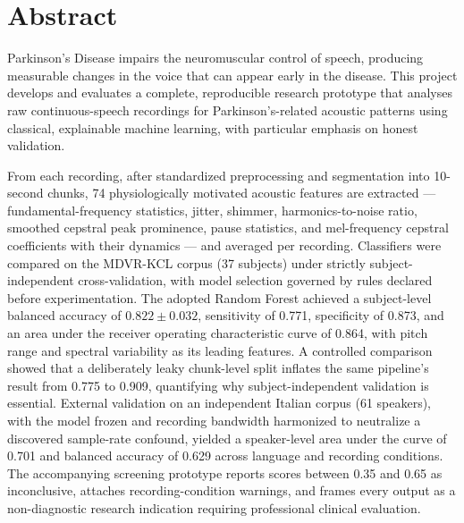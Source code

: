 \chapter*{Abstract}

Parkinson's Disease impairs the neuromuscular control of speech,
producing measurable changes in the voice that can appear early in the
disease. This project develops and evaluates a complete, reproducible
research prototype that analyses raw continuous-speech recordings for
Parkinson's-related acoustic patterns using classical, explainable
machine learning, with particular emphasis on honest validation.

From each recording, after standardized preprocessing and segmentation
into 10-second chunks, 74 physiologically motivated acoustic features
are extracted --- fundamental-frequency statistics, jitter, shimmer,
harmonics-to-noise ratio, smoothed cepstral peak prominence, pause
statistics, and mel-frequency cepstral coefficients with their
dynamics --- and averaged per recording. Classifiers were compared on
the MDVR-KCL corpus (37 subjects) under strictly subject-independent
cross-validation, with model selection governed by rules declared
before experimentation. The adopted Random Forest achieved a
subject-level balanced accuracy of $0.822 \pm 0.032$, sensitivity of
0.771, specificity of 0.873, and an area under the receiver operating
characteristic curve of 0.864, with pitch range and spectral
variability as its leading features. A controlled comparison showed
that a deliberately leaky chunk-level split inflates the same
pipeline's result from 0.775 to 0.909, quantifying why
subject-independent validation is essential. External validation on an
independent Italian corpus (61 speakers), with the model frozen and
recording bandwidth harmonized to neutralize a discovered sample-rate
confound, yielded a speaker-level area under the curve of 0.701 and
balanced accuracy of 0.629 across language and recording conditions.
The accompanying screening prototype reports scores between 0.35 and
0.65 as inconclusive, attaches recording-condition warnings, and
frames every output as a non-diagnostic research indication requiring
professional clinical evaluation.
\thispagestyle{plain}
